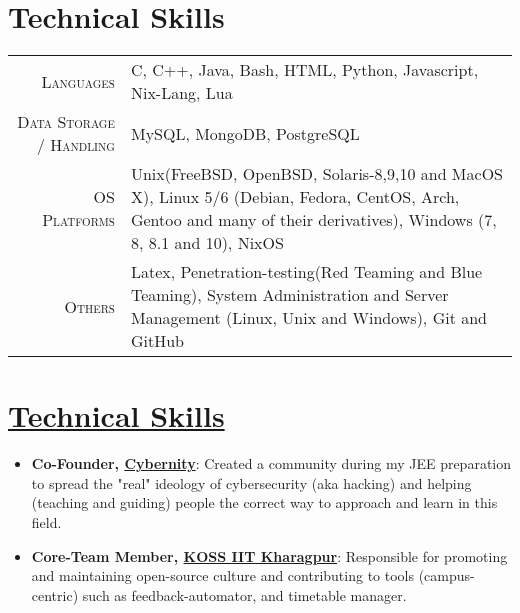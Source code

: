 \documentclass[a4paper,10pt]{extarticle} %
\begin{document}
 \vspace{-0.3cm}
 \section{\textcolor{primary}{Technical Skills}}
 \vspace{+0.1cm}

 \begin{tabular}{r|p{15cm}}
 \textsc{Languages} & C, C++, Java, Bash, HTML, Python, Javascript, Nix-Lang, Lua \\
 \textsc{Data Storage / Handling} & MySQL, MongoDB, PostgreSQL \\
 \textsc{OS Platforms} & Unix(FreeBSD, OpenBSD, Solaris-8,9,10 and MacOS X), Linux 5/6 (Debian, Fedora, CentOS, Arch, Gentoo and many of their derivatives), Windows (7, 8, 8.1 and 10), NixOS \\
 \textsc{Others} & Latex, Penetration-testing(Red Teaming and Blue Teaming), System Administration and Server Management (Linux, Unix and Windows), Git and GitHub \\
\end{tabular}


\vspace{+0.2cm}
\section{\textcolor{primary}{\href{https://www.github.com/proffapt/bodhitree}{Technical Skills}}}
\vspace{+0.1cm}

\begin{itemize}[leftmargin=0.55cm, rightmargin=0.2cm, label={\Large\textbullet}]

\item \textbf{Co-Founder, \href{https://cybernity.org/}{Cybernity}}: Created a community during my JEE preparation to spread the "real" ideology of cybersecurity (aka hacking) and helping (teaching and guiding) people the correct way to approach and learn in this field.

\item \textbf{Core-Team Member, \href{https://kossiitkgp.org/about/index.html}{KOSS IIT Kharagpur}}: Responsible for promoting and maintaining open-source culture and contributing to tools (campus-centric) such as feedback-automator, and timetable manager.

\end{itemize}
\end{document}
